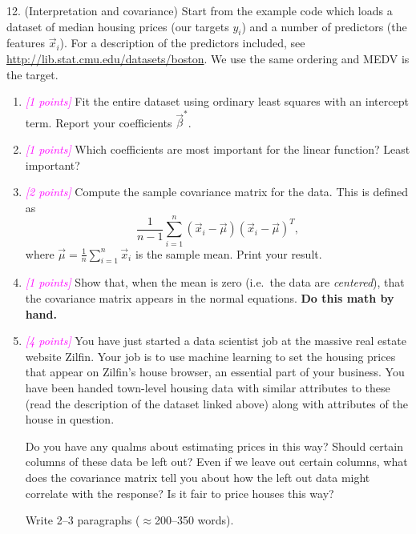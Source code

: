 \documentclass{article}
\newcommand{\points}[1]{\small\textcolor{magenta}{\emph{[#1 points]}} \normalsize}
\begin{document}
12. (Interpretation and covariance)
Start from the example code which loads a dataset of median housing prices (our targets $y_i$)
and a number of predictors (the features $\vec x_i$).
For a description of the predictors included, see \url{http://lib.stat.cmu.edu/datasets/boston}.
We use the same ordering and MEDV is the target.
\begin{enumerate}
\item \points{1} Fit the entire dataset using ordinary least squares with an intercept term.
  Report your coefficients $\vec \beta^*$.
\item \points{1} Which coefficients are most important for the linear function? Least important?
\item \points{2} Compute the sample covariance matrix for the data. This is defined as 
$$
\frac{1}{n-1} \sum_{i=1}^n (\vec x_i - \vec \mu)(\vec x_i - \vec \mu)^T,
$$
where $\vec \mu = \frac{1}{n} \sum_{i=1}^n \vec x_i$ is the sample mean.
Print your result.
\item \points{1} Show that, when the mean is zero (i.e.\ the data are {\em centered}), that the covariance 
  matrix appears in the normal equations. {\bf Do this math by hand.}
\item \points{4} You have just started a data scientist job at the massive real estate website Zilfin.
  Your job is to use machine learning to set the housing prices that appear on Zilfin's house browser,
  an essential part of your business. 
  You have been handed town-level housing data with similar attributes to these
  (read the description of the dataset linked above) along with attributes of the house in question.
  
  Do you have any qualms about estimating prices in this way? 
  Should certain columns of these data be left out?
  Even if we leave out certain columns, what does the covariance matrix tell you about how the left out
  data might correlate with the response?
  Is it fair to price houses this way?

  Write 2--3 paragraphs ($\approx$200--350 words).
\end{enumerate}
\end{document}
